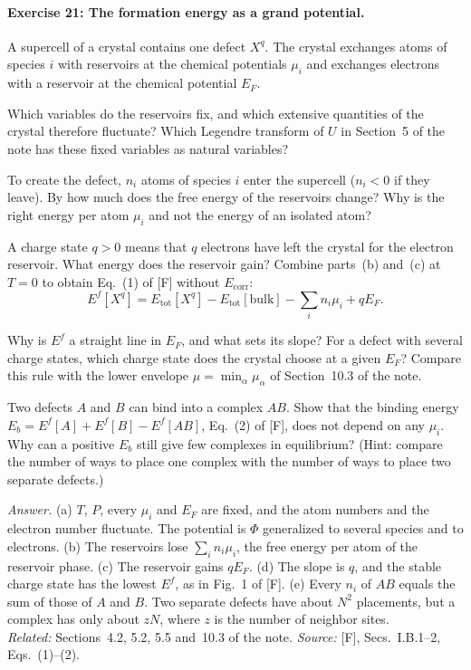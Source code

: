 \documentclass[11pt]{article}      %
\numberwithin{equation}{section}   %
\begin{document}
\paragraph{Exercise 21: The formation energy as a grand potential.}
A supercell of a crystal contains one defect $X^q$. The crystal exchanges atoms of species $i$ with reservoirs at the chemical potentials $\mu_i$ and exchanges electrons with a reservoir at the chemical potential $E_F$.
\begin{parts}
    \item Which variables do the reservoirs fix, and which extensive quantities of the crystal therefore fluctuate? Which Legendre transform of $U$ in Section~5 of the note has these fixed variables as natural variables?
    \item To create the defect, $n_i$ atoms of species $i$ enter the supercell ($n_i<0$ if they leave). By how much does the free energy of the reservoirs change? Why is the right energy per atom $\mu_i$ and not the energy of an isolated atom?
    \item A charge state $q>0$ means that $q$ electrons have left the crystal for the electron reservoir. What energy does the reservoir gain? Combine parts~(b) and~(c) at $T = 0$ to obtain Eq.~(1) of [F] without $E_{\text{corr}}$:
    \begin{equation*}
        E^f[X^q] = E_{\text{tot}}[X^q] - E_{\text{tot}}[\text{bulk}] - \sum_i n_i\mu_i + qE_F.
    \end{equation*}
    \item Why is $E^f$ a straight line in $E_F$, and what sets its slope? For a defect with several charge states, which charge state does the crystal choose at a given $E_F$? Compare this rule with the lower envelope $\mu = \min_\alpha\mu_\alpha$ of Section~10.3 of the note.
    \item Two defects $A$ and $B$ can bind into a complex $AB$. Show that the binding energy $E_b = E^f[A] + E^f[B] - E^f[AB]$, Eq.~(2) of [F], does not depend on any $\mu_i$. Why can a positive $E_b$ still give few complexes in equilibrium? (Hint: compare the number of ways to place one complex with the number of ways to place two separate defects.)
\end{parts}
\textit{Answer.} (a) $T$, $P$, every $\mu_i$ and $E_F$ are fixed, and the atom numbers and the electron number fluctuate. The potential is $\Phi$ generalized to several species and to electrons. (b) The reservoirs lose $\sum_i n_i\mu_i$, the free energy per atom of the reservoir phase. (c) The reservoir gains $qE_F$. (d) The slope is $q$, and the stable charge state has the lowest $E^f$, as in Fig.~1 of [F]. (e) Every $n_i$ of $AB$ equals the sum of those of $A$ and $B$. Two separate defects have about $N^2$ placements, but a complex has only about $zN$, where $z$ is the number of neighbor sites.\\
\textit{Related:} Sections~4.2, 5.2, 5.5 and~10.3 of the note. \textit{Source:} [F], Secs.~I.B.1--2, Eqs.~(1)--(2).
\end{document}
